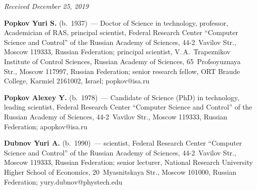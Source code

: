 \begin{multicols}{2}
{{\begin{thebibliography}{99}
 
\end{thebibliography}

 }
 }

\end{multicols}

\vspace*{-3pt}

\hfill{\small\textit{Received December 25, 2019}}




\Contr

\noindent
\textbf{Popkov Yuri S.} (b.\ 1937)~--- Doctor of Science in technology, professor, Academician of 
RAS, principal scientist, Federal Research Center ``Computer Science and Control'' of the Russian 
Academy of Sciences, 44-2~Vavilov Str., Moscow 119333, Russian Federation; principal scientist, 
V.\,A.~Trapeznikov Institute of Control Sciences, Russian Academy of Sciences, 65~Profsoyuznaya 
Str., Moscow 117997, Russian Federation; senior research fellow, ORT Braude College, Karmiel 
2161002, Israel; \mbox{popkov@isa.ru}

\vspace*{3pt}

\noindent
\textbf{Popkov Alexey Y.} (b.\ 1978)~--- Candidate of Science (PhD) in technology, leading 
scientist, Federal Research Center ``Computer Science and Control'' of the Russian Academy of 
Sciences, 44-2~Vavilov Str., Moscow 119333, Russian Federation; \mbox{apopkov@isa.ru}

\vspace*{3pt}

\noindent
\textbf{Dubnov Yuri A.} (b.\ 1990)~--- scientist, Federal Research Center ``Computer Science and 
Control'' of the Russian Academy of Sciences, 44-2~Vavilov Str., Moscow 119333, Russian 
Federation; senior lecturer, National Research University Higher School of Economics, 
20~Myasnitskaya Str., Moscow 101000, Russian Federation; \mbox{yury.dubnov@phystech.edu}

\label{end\stat}

\renewcommand{\bibname}{\protect\rm Литература} 